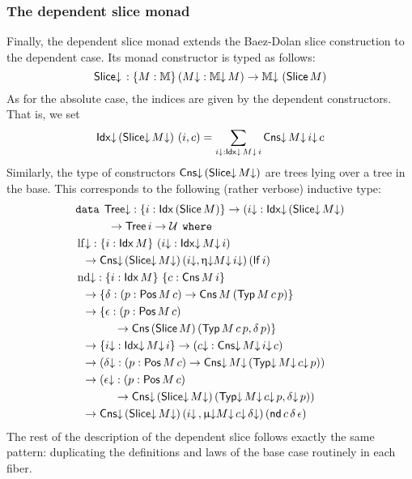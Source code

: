 \subsubsection{The dependent slice monad}

Finally, the dependent slice monad extends the Baez-Dolan
slice construction to the dependent case.  Its monad constructor
is typed as follows:
\[ \Sliced : \{M : \MM\}\, (M\da : \MMd\, M) \to \MMd\ (\Slice M) \]
As for the absolute case, the indices are given by the dependent
constructors.  That is, we set
\[ \Idxd (\Sliced M\da)\ (i , c) = \sum_{i\da : \Idxd M\da\, i} \Cnsd
  M\da\, i\da\, c \] Similarly, the type of constructors
$\Cnsd (\Sliced M\da)$ are trees lying over a tree in the base.  This
corresponds to the following (rather verbose) inductive type:
\begin{align*}
  &\texttt{data}\hspace{1ex} \mathsf{Tree\da} : \{i : \Idx (\Slice M)\} \to (i\da : \Idxd (\Sliced M\da) \\
  &\hspace{1cm} \to \mathsf{Tree}\, i \to \UU \hspace{1ex} \texttt{where} \\
  &\lfd : \{i : \Idx M\}\ (i\da : \Idxd M\da\, i)\\
  &\hspace{.2cm}\to \Cnsd (\Sliced M\da)\, (i\da, \upetad M\da\, i\da)\, (\lf i) \\
  &\ndd : \{i : \Idx M\}\ \{c : \Cns M\, i\}\\ 
  &\hspace{.2cm}\to \{\delta : (p : \Pos M\, c) \to \Cns M\, (\Typ M\, c\, p)\}\\
  &\hspace{.2cm}\to \{\epsilon : (p : \Pos M\, c) \\
  &\hspace{1.2cm}\to \Cns (\Slice M)\, (\Typ M\, c\, p, \delta\, p)\}\\ 
  &\hspace{.2cm}\to \{i\da : \Idxd M\da\, i\} \to (c\da : \Cnsd M\da\, i\da\, c)\\
  &\hspace{.2cm}\to (\delta\da : (p : \Pos M\, c) \to \Cnsd M\da\, (\Typd M\da\, c\da\, p))\\ 
  &\hspace{.2cm}\to (\epsilon\da : (p : \Pos M\, c) \\
  &\hspace{1.2cm}\to \Cnsd (\Sliced M\da)\, (\Typd M\da\, c\da\, p, \delta\da\, p))\\ 
  &\hspace{.2cm}\to \Cnsd (\Sliced M\da)\, (i\da \,, \upmud M\da\, c\da\, \delta\da)\, (\nd c\, \delta\, \epsilon)
\end{align*}
The rest of the description of the dependent slice follows exactly the
same pattern: duplicating the definitions and laws of the base case
routinely in each fiber.

